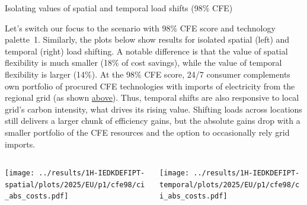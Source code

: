\begin{frame}{Isolating values of spatial and temporal load shifts (98\% CFE)}

  {\footnotesize
  \vspace{-0.2cm}
  Let's switch our focus to the scenario with \alert{98\% CFE score and technology palette~1}. Similarly, the plots below show results for isolated spatial (left) and temporal (right) load shifting. A notable difference is that the value of spatial flexibility is much smaller (18\% of cost savings), while the value of temporal flexibility is larger (14\%). At the 98\% CFE score, 24/7 consumer complements own portfolio of procured CFE technologies with imports of electricity from the regional grid (as shown \hyperlink{cfe98cost}{above}). Thus, temporal shifts are also \alert{responsive to local grid's carbon intensity}, what drives its rising value. Shifting loads across locations still delivers a larger chunk of efficiency gains, but the absolute gains drop with a smaller portfolio of the CFE resources and the option to occasionally rely grid imports.

  \begin{columns}
    \begin{column}{7cm}
    \texttt{[image: ../results/1H-IEDKDEFIPT-spatial/plots/2025/EU/p1/cfe98/ci\_abs\_costs.pdf]}
    \end{column}
    
    \begin{column}{7cm}
    \texttt{[image: ../results/1H-IEDKDEFIPT-temporal/plots/2025/EU/p1/cfe98/ci\_abs\_costs.pdf]}
    \end{column}
  \end{columns}

  }
\end{frame}


